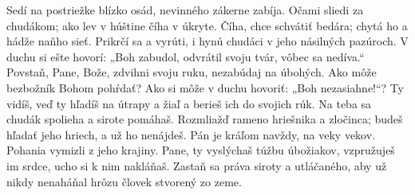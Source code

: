 Sedí na postriežke blízko osád,
nevinného zákerne zabíja.
\versseparator
Očami sliedi za chudákom;
ako lev v húštine číha v úkryte.
\versseparator
Číha, chce schvátiť bedára;
chytá ho a hádže naňho sieť.
\versseparator
Prikrčí sa a vyrúti, i hynú chudáci
v jeho násilných pazúroch.
\versseparator
V duchu si ešte hovorí: „Boh zabudol,
odvrátil svoju tvár, vôbec sa nedíva.“
\versseparator
Povstaň, Pane, Bože, zdvihni svoju ruku,
nezabúdaj na úbohých.
\versseparator
Ako môže bezbožník Bohom pohŕdať?
Ako si môže v duchu hovoriť: „Boh nezasiahne!“?
\versseparator
Ty vidíš, veď ty hľadíš na útrapy a žiaľ
a berieš ich do svojich rúk.
\versseparator
Na teba sa chudák spolieha
a sirote pomáhaš.
\versseparator
Rozmliažď rameno hriešnika a zločinca;
budeš hľadať jeho hriech, a už ho nenájdeš.
\versseparator
Pán je kráľom navždy, na veky vekov.
Pohania vymizli z jeho krajiny.
\versseparator
Pane, ty vyslýchaš túžbu úbožiakov,
vzpružuješ im srdce, ucho si k nim nakláňaš.
\versseparator
Zastaň sa práva siroty a utláčaného,
aby už nikdy nenaháňal hrôzu človek stvorený zo zeme.
